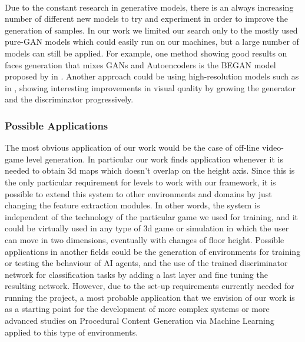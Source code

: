 \paragraph{} Due to the constant research in generative models, there is an always increasing number of different new models to try and experiment in order to improve the generation of samples. In our work we limited our search only to the mostly used pure-GAN models which could easily run on our machines, but a large number of models can still be applied.
For example, one method showing good results on faces generation that mixes GANs and Autoencoders is the BEGAN model proposed by \citeauthor{gan:BEGAN} in \cite{gan:BEGAN}. Another approach could be using high-resolution models such as in \textit{} \cite{gan:high-res}, showing interesting improvements in visual quality by growing the generator and the discriminator progressively.

\subsubsection{Possible Applications}
The most obvious application of our work would be the case of off-line video-game level generation. In particular our work finds application whenever it is needed to obtain 3d maps which doesn't overlap on the height axis. Since this is the only particular requirement for levels to work with our framework, it is possible to extend this system to other environments and domains by just changing the feature extraction modules. In other words, the system is independent of the technology of the particular game we used for training, and it could be virtually used in any type of 3d game or simulation in which the user can move in two dimensions, eventually with changes of floor height. Possible applications in another fields could be the generation of environments for training or testing the behaviour of AI agents, and the use of the trained discriminator network for classification tasks by adding a last layer and fine tuning the resulting network. However, due to the set-up requirements currently needed for running the project, a most probable application that we envision of our work is as a starting point for the development of more complex systems or more advanced studies on Procedural Content Generation via Machine Learning applied to this type of environments.

